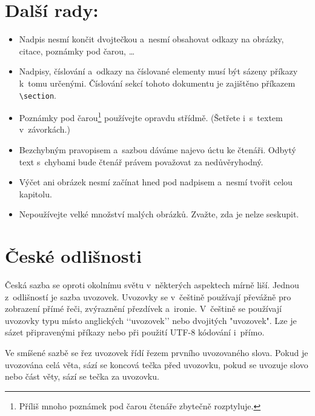 \documentclass[a4paper,10pt, twocolumn]{article}
\begin{document}
\section{Další rady:}

\begin{itemize}
\item Nadpis nesmí končit dvojtečkou a~nesmí obsahovat odkazy na obrázky, citace, poznámky pod čarou, \dots

\item Nadpisy, číslování a~odkazy na číslované elementy musí být sázeny příkazy k~tomu určenými.
Číslování sekcí tohoto dokumentu je zajištěno příkazem \verb|\section|.

\item Poznámky pod čarou\footnote{Příliš mnoho poznámek pod čarou čtenáře zbytečně rozptyluje.} používejte opravdu střídmě.
(Šetřete i~s~textem v~závorkách.)

\item Bezchybným pravopisem a~sazbou dáváme najevo úctu ke čtenáři.
Odbytý text s~chybami bude čtenář právem považovat za nedůvěryhodný.

\item Výčet ani obrázek nesmí začínat hned pod nadpisem a~nesmí tvořit celou kapitolu.

\item Nepoužívejte velké množství malých obrázků.
Zvažte, zda je nelze seskupit.
\end{itemize}

\section{České odlišnosti}

Česká sazba se oproti okolnímu světu v~některých aspektech mírně liší.
Jednou z~odlišností je sazba uvozovek.
Uvozovky se v~češtině používají převážně pro zobrazení přímé řeči, zvýraznění přezdívek a~ironie.
V~češtině se používají uvozovky typu  místo anglických ‘‘uvozovek’’ nebo dvojitých "uvozovek".
Lze je sázet připravenými příkazy nebo při použití UTF-8 kódování i~přímo.

Ve smíšené sazbě se řez uvozovek řídí řezem prvního uvozovaného slova.
Pokud je uvozována celá věta, sází se koncová tečka před uvozovku, pokud se uvozuje slovo nebo část věty, sází se tečka za uvozovku.
\end{document}

